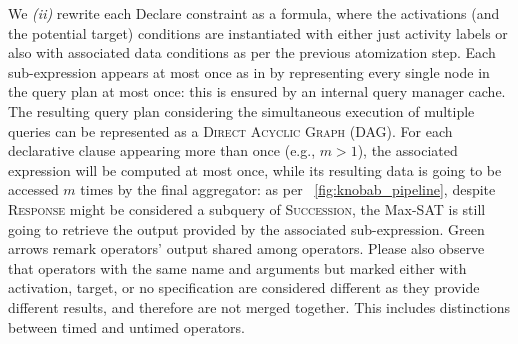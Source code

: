 We \textit{(ii)} rewrite each Declare constraint as a \xLTLf formula, where the activations (and the potential target) conditions are instantiated with either just activity labels or also with associated data conditions as per the previous atomization step. 
Each sub-expression appears at most once as in \cite{BellatrecheKB21} by representing every single node in the query plan at most once: this is ensured by an internal query manager cache. The resulting query plan considering the simultaneous execution of multiple queries can be represented as a \textsc{Direct Acyclic Graph} (DAG).  
For each declarative clause appearing more than once (e.g., $m>1$), the associated \xLTLf expression will be computed at most  once, while its resulting data is going to be accessed $m$ times by the final aggregator: as per \figurename~\ref{fig:knobab_pipeline}, despite \textsc{Response} might be considered a subquery of \textsc{Succession}, the Max-SAT is still going to retrieve the output provided by the associated sub-expression. Green arrows remark operators' output shared among operators. Please also observe that operators with the same name and arguments but marked either with activation, target, or no specification are considered different as they provide different results, and therefore are not merged together. 
This includes distinctions between timed and untimed operators.

